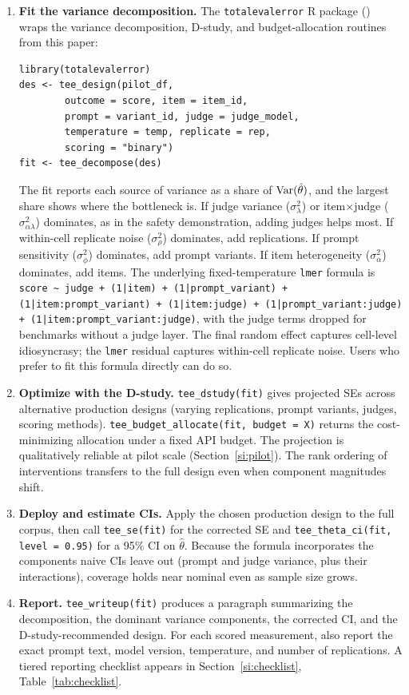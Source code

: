 \begin{enumerate}
\item \textbf{Fit the variance decomposition.} The \texttt{totalevalerror} R package (\codeurl) wraps the variance decomposition, D-study, and budget-allocation routines from this paper:
\begin{verbatim}
library(totalevalerror)
des <- tee_design(pilot_df,
        outcome = score, item = item_id,
        prompt = variant_id, judge = judge_model,
        temperature = temp, replicate = rep,
        scoring = "binary")
fit <- tee_decompose(des)
\end{verbatim}
The fit reports each source of variance as a share of $\operatorname{Var}(\hat\theta)$, and the largest share shows where the bottleneck is. If judge variance ($\sigma^2_\lambda$) or item$\times$judge ($\sigma^2_{\alpha\lambda}$) dominates, as in the safety demonstration, adding judges helps most. If within-cell replicate noise ($\sigma^2_\rho$) dominates, add replications. If prompt sensitivity ($\sigma^2_\phi$) dominates, add prompt variants. If item heterogeneity ($\sigma^2_\alpha$) dominates, add items. The underlying fixed-temperature \texttt{lmer} formula is \texttt{score \textasciitilde{} judge + (1|item) + (1|prompt\_variant) + (1|item:prompt\_variant) + (1|item:judge) + (1|prompt\_variant:judge) + (1|item:prompt\_variant:judge)}, with the judge terms dropped for benchmarks without a judge layer. The final random effect captures cell-level idiosyncrasy; the \texttt{lmer} residual captures within-cell replicate noise. Users who prefer to fit this formula directly can do so.

\item \textbf{Optimize with the D-study.} \texttt{tee\_dstudy(fit)} gives projected SEs across alternative production designs (varying replications, prompt variants, judges, scoring methods). \texttt{tee\_budget\_allocate(fit, budget = X)} returns the cost-minimizing allocation under a fixed API budget. The projection is qualitatively reliable at pilot scale (Section~\ref{si:pilot}). The rank ordering of interventions transfers to the full design even when component magnitudes shift.

\item \textbf{Deploy and estimate CIs.} Apply the chosen production design to the full corpus, then call \texttt{tee\_se(fit)} for the corrected SE and \texttt{tee\_theta\_ci(fit, level = 0.95)} for a 95\% CI on $\hat\theta$. Because the formula incorporates the components naive CIs leave out (prompt and judge variance, plus their interactions), coverage holds near nominal even as sample size grows.

\item \textbf{Report.} \texttt{tee\_writeup(fit)} produces a paragraph summarizing the decomposition, the dominant variance components, the corrected CI, and the D-study-recommended design. For each scored measurement, also report the exact prompt text, model version, temperature, and number of replications. A tiered reporting checklist appears in Section~\ref{si:checklist}, Table~\ref{tab:checklist}.
\end{enumerate}


